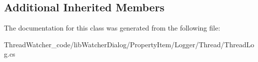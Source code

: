 \subsection*{Additional Inherited Members}


The documentation for this class was generated from the following file\+:\begin{DoxyCompactItemize}
\item 
Thread\+Watcher\+\_\+code/lib\+Watcher\+Dialog/\+Property\+Item/\+Logger/\+Thread/Thread\+Log.\+cs\end{DoxyCompactItemize}
